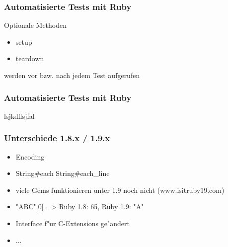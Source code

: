 \documentclass{beamer}
\begin{document}
\begin{frame}[containsverbatim]
  
  
\end{frame}

\begin{frame}
  \frametitle{Automatisierte Tests mit Ruby}
Optionale Methoden 
\begin{itemize}
  \item setup
  \item teardown
\end{itemize}
werden vor bzw. nach jedem Test aufgerufen
\end{frame}

\begin{frame}
  \frametitle{Automatisierte Tests mit Ruby}
 lsjkdflsjfal 
\end{frame}

\begin{frame}
 \frametitle{Unterschiede 1.8.x / 1.9.x}
 \begin{itemize}
   \item<1->Encoding
   \item<2->String#each \arrow String#each_line
   \item<3->viele Gems funktionieren unter 1.9 noch nicht (www.isitruby19.com)
   \item<4->"ABC"[0] => Ruby 1.8: 65, Ruby 1.9: "A"
   \item<5->Interface f"ur C-Extensions ge"andert
   \item ... 
 \end{itemize}

\end{frame}
\end{document}
